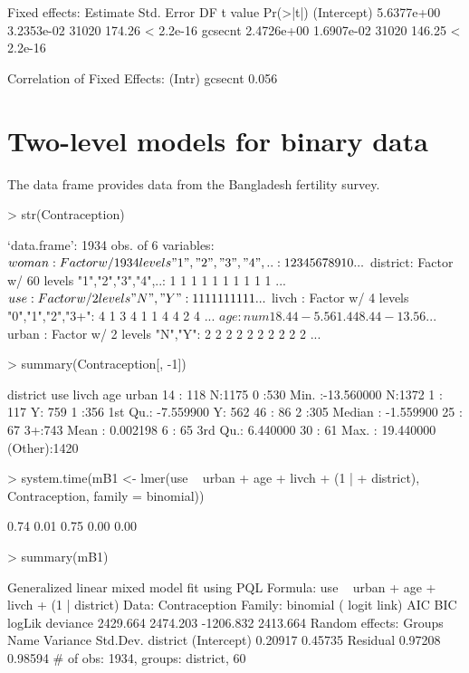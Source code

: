 \documentclass[12pt]{article}
\begin{document}
\begin{Schunk}
\begin{Soutput}
Fixed effects:
              Estimate Std. Error    DF t value  Pr(>|t|)
(Intercept) 5.6377e+00 3.2353e-02 31020  174.26 < 2.2e-16
gcsecnt     2.4726e+00 1.6907e-02 31020  146.25 < 2.2e-16

Correlation of Fixed Effects:
        (Intr)
gcsecnt 0.056 
\end{Soutput}
\end{Schunk}


\section{Two-level models for binary data}
\label{sec:TwolevelBinary}

The data frame  provides data from the
Bangladesh fertility survey.
\begin{Schunk}
\begin{Sinput}
> str(Contraception)
\end{Sinput}
\begin{Soutput}
`data.frame':	1934 obs. of  6 variables:
 $ woman   : Factor w/ 1934 levels "1","2","3","4",..: 1 2 3 4 5 6 7 8 9 10 ...
 $ district: Factor w/ 60 levels "1","2","3","4",..: 1 1 1 1 1 1 1 1 1 1 ...
 $ use     : Factor w/ 2 levels "N","Y": 1 1 1 1 1 1 1 1 1 1 ...
 $ livch   : Factor w/ 4 levels "0","1","2","3+": 4 1 3 4 1 1 4 4 2 4 ...
 $ age     : num   18.44  -5.56   1.44   8.44 -13.56 ...
 $ urban   : Factor w/ 2 levels "N","Y": 2 2 2 2 2 2 2 2 2 2 ...
\end{Soutput}
\begin{Sinput}
> summary(Contraception[, -1])
\end{Sinput}
\begin{Soutput}
    district    use      livch         age             urban   
 14     : 118   N:1175   0 :530   Min.   :-13.560000   N:1372  
 1      : 117   Y: 759   1 :356   1st Qu.: -7.559900   Y: 562  
 46     :  86            2 :305   Median : -1.559900           
 25     :  67            3+:743   Mean   :  0.002198           
 6      :  65                     3rd Qu.:  6.440000           
 30     :  61                     Max.   : 19.440000           
 (Other):1420                                                  
\end{Soutput}
\begin{Sinput}
> system.time(mB1 <- lmer(use ~ urban + age + livch + (1 | 
+     district), Contraception, family = binomial))
\end{Sinput}
\begin{Soutput}
[1] 0.74 0.01 0.75 0.00 0.00
\end{Soutput}
\begin{Sinput}
> summary(mB1)
\end{Sinput}
\begin{Soutput}
Generalized linear mixed model fit using PQL 
Formula: use ~ urban + age + livch + (1 | district) 
   Data: Contraception 
 Family: binomial ( logit link)
      AIC      BIC    logLik deviance
 2429.664 2474.203 -1206.832 2413.664
Random effects:
 Groups   Name        Variance Std.Dev.
 district (Intercept) 0.20917  0.45735 
 Residual             0.97208  0.98594 
# of obs: 1934, groups: district, 60


\end{Soutput}
\end{Schunk}
\end{document}
